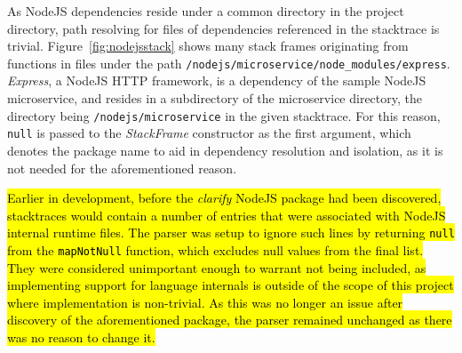 \documentclass[12pt,pdftex,titlepage]{report}
\begin{document}
                    As NodeJS dependencies reside under a common directory in the project directory, path resolving for files of dependencies referenced in the stacktrace is trivial. 
                    Figure~\ref{fig:nodejsstack} shows many stack frames originating from functions in files under the path \texttt{/nodejs/microservice/node\_modules/express}. \textit{Express},
                    a NodeJS HTTP framework, is a dependency of the sample NodeJS microservice, and resides in a subdirectory of the microservice directory, the directory being \texttt{/nodejs/microservice}
                    in the given stacktrace. For this reason, \texttt{null} is passed to the \textit{StackFrame} constructor as the first argument, which denotes the package name to aid in
                    dependency resolution and isolation, as it is not needed for the aforementioned reason.

                    \hl{Earlier in development, before the \textit{clarify}{\cite{clarify}} NodeJS package had been discovered, stacktraces would contain a number of entries that were associated with NodeJS internal 
                    runtime files. The parser was setup to ignore such lines by returning \texttt{null} from the \texttt{mapNotNull} function, which excludes null values from the final list. They were considered unimportant 
                    enough to warrant not being included, as implementing support for language internals is outside of the scope of this project where implementation is non-trivial. As this was no longer an issue
                    after discovery of the aforementioned package, the parser remained unchanged as there was no reason to change it.}
\end{document}
